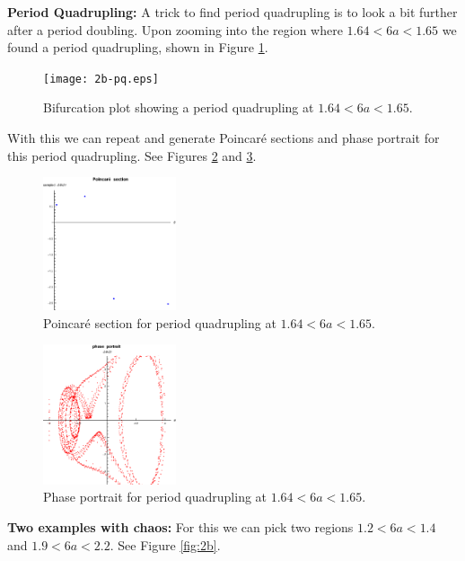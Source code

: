 \documentclass{article}
\theoremstyle{definition}
\begin{document}
\begin{enumerate}[label=(\alph*)]
	
	\newpage
	
	\textbf{Period Quadrupling:} A trick to find period quadrupling is to look a bit further after a period doubling. Upon zooming into the region where $1.64 < 6a < 1.65$ we found a period quadrupling, shown in Figure \ref{fig:pq}.
	
	\begin{figure}[!htb]
		\centering
		\texttt{[image: 2b-pq.eps]}
		\caption{Bifurcation plot showing a period quadrupling at $1.64 < 6a < 1.65$.}
		\label{fig:pq}
	\end{figure}
	
	With this we can repeat and generate Poincar\'{e} sections and phase portrait for this period quadrupling. See Figures \ref{fig:pq-poincare} and \ref{fig:pq-phase}.
	
	\begin{figure}[!htb]
		\centering
		\includegraphics[width=0.35\textwidth]{pq-poincare.eps}
		\caption{Poincar\'{e} section for period quadrupling at $1.64 < 6a < 1.65$.}
		\label{fig:pq-poincare}
	\end{figure}
	
	\begin{figure}[!htb]
		\centering
		\includegraphics[width=0.35\textwidth]{pq-phase.eps}
		\caption{Phase portrait for period quadrupling at $1.64 < 6a < 1.65$.}
		\label{fig:pq-phase}
	\end{figure}
	
	
	
	
	\newpage
	
	
	\textbf{Two examples with chaos:} For this we can pick two regions $1.2 < 6a < 1.4$ and $1.9 < 6a < 2.2$. See Figure \ref{fig:2b}.
	

\end{enumerate}
\end{document}
